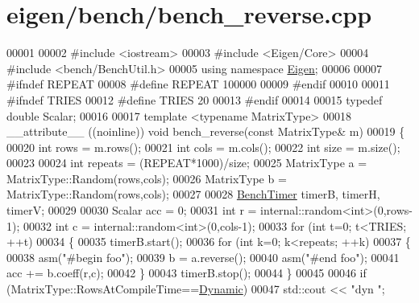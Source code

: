 \hypertarget{eigen_2bench_2bench__reverse_8cpp_source}{}\section{eigen/bench/bench\+\_\+reverse.cpp}
\label{eigen_2bench_2bench__reverse_8cpp_source}

\begin{DoxyCode}
00001 
00002 \textcolor{preprocessor}{#include <iostream>}
00003 \textcolor{preprocessor}{#include <Eigen/Core>}
00004 \textcolor{preprocessor}{#include <bench/BenchUtil.h>}
00005 \textcolor{keyword}{using namespace }\hyperlink{namespace_eigen}{Eigen};
00006 
00007 \textcolor{preprocessor}{#ifndef REPEAT}
00008 \textcolor{preprocessor}{#define REPEAT 100000}
00009 \textcolor{preprocessor}{#endif}
00010 
00011 \textcolor{preprocessor}{#ifndef TRIES}
00012 \textcolor{preprocessor}{#define TRIES 20}
00013 \textcolor{preprocessor}{#endif}
00014 
00015 \textcolor{keyword}{typedef} \textcolor{keywordtype}{double} Scalar;
00016 
00017 \textcolor{keyword}{template} <\textcolor{keyword}{typename} MatrixType>
00018 \_\_attribute\_\_ ((noinline)) \textcolor{keywordtype}{void} bench\_reverse(\textcolor{keyword}{const} MatrixType& m)
00019 \{
00020   \textcolor{keywordtype}{int} rows = m.rows();
00021   \textcolor{keywordtype}{int} cols = m.cols();
00022   \textcolor{keywordtype}{int} size = m.size();
00023 
00024   \textcolor{keywordtype}{int} repeats = (REPEAT*1000)/size;
00025   MatrixType a = MatrixType::Random(rows,cols);
00026   MatrixType b = MatrixType::Random(rows,cols);
00027 
00028   \hyperlink{class_eigen_1_1_bench_timer}{BenchTimer} timerB, timerH, timerV;
00029 
00030   Scalar acc = 0;
00031   \textcolor{keywordtype}{int} r = internal::random<int>(0,rows-1);
00032   \textcolor{keywordtype}{int} c = internal::random<int>(0,cols-1);
00033   \textcolor{keywordflow}{for} (\textcolor{keywordtype}{int} t=0; t<TRIES; ++t)
00034   \{
00035     timerB.start();
00036     \textcolor{keywordflow}{for} (\textcolor{keywordtype}{int} k=0; k<repeats; ++k)
00037     \{
00038       \textcolor{keyword}{asm}(\textcolor{stringliteral}{"#begin foo"});
00039       b = a.reverse();
00040       \textcolor{keyword}{asm}(\textcolor{stringliteral}{"#end foo"});
00041       acc += b.coeff(r,c);
00042     \}
00043     timerB.stop();
00044   \}
00045 
00046   \textcolor{keywordflow}{if} (MatrixType::RowsAtCompileTime==\hyperlink{namespace_eigen_ad81fa7195215a0ce30017dfac309f0b2}{Dynamic})
00047     std::cout << \textcolor{stringliteral}{"dyn   "};

\end{DoxyCode}
